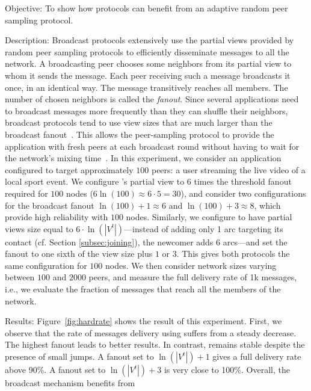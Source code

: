 \begin{asparadesc}
\item [Objective:] To show how protocols can benefit from an adaptive random
  peer sampling protocol.
\item [Description:] Broadcast protocols extensively use the partial
  views provided by random peer sampling protocols to efficiently
  disseminate messages to all the network. A broadcasting peer chooses
  some neighbors from its partial view to whom it sends the
  message. Each peer receiving such a message broadcasts it once, in
  an identical way. The message transitively reaches all members. The
  number of chosen neighbors is called the \emph{fanout}. Since
  several applications need to broadcast messages more frequently than
  they can shuffle their neighbors, broadcast protocols tend to use
  view sizes that are much larger than the broadcast
  fanout~\cite{Frey09Middleware}. This allows the peer-sampling
  protocol to provide the application with fresh peers at each
  broadcast round without having to wait for the network's mixing
  time~\cite{jelasity2007gossip}. In this experiment, we consider an
  application configured to target approximately $100$ peers: a user
  streaming the live video of a local sport event. We configure
  \CYCLON's partial view to $6$ times the threshold fanout required
  for $100$ nodes ($6 \ln(100) \approx 6 \cdot 5 = 30$), and consider
  two configurations for the broadcast fanout $\ln(100)+1 \approx 6 $
  and $\ln(100)+3 \approx 8$, which provide high reliability with
  $100$ nodes. Similarly, we configure \SPRAY to have partial views
  size equal to $6 \cdot \ln(|V^t|)$---instead of adding only 1 arc
  targeting its contact (cf. Section \ref{subsec:joining}), the
  newcomer adds 6 arcs---and set the fanout to one sixth of the view
  size plus $1$ or $3$. This gives both protocols the same
  configuration for $100$ nodes.  We then consider network sizes
  varying between $100$ and $2000$ peers, and measure the full
  delivery rate of 1k messages, i.e., we evaluate the fraction of
  messages that reach all the members of the network.
\item [Results:] Figure~\ref{fig:hardrate} shows the result of this
  experiment. First, we observe that the rate of messages delivery
  using \CYCLON suffers from a steady decrease. The highest fanout
  leads to better results. In contrast, \SPRAY remains stable despite
  the presence of small jumps. A fanout set to $\ln(|V^t|)+1$ gives a
  full delivery rate above 90\%. A fanout set to $\ln(|V^t|)+3$ is
  very close to 100\%. Overall, the broadcast mechanism benefits from

\end{asparadesc}

